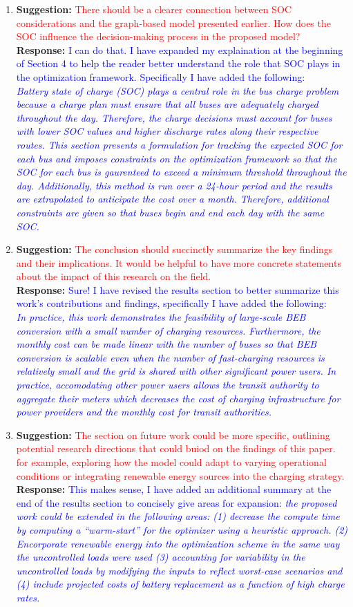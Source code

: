 \documentclass{article}
\newcommand\formatfeedback[2]
{%
	\textbf{Suggestion:} \textcolor{red}{#1} 
	\\[0.1in] \textbf{Response:} \textcolor{blue}{#2}
}
\begin{document}
\begin{enumerate}
	\item \formatfeedback{There should be a clearer connection between SOC considerations and the graph-based model presented earlier. How does the SOC influence the decision-making process in the proposed model?}
			     {I can do that.  I have expanded my explaination at the beginning of Section 4 to help the reader better understand the role that SOC plays in the optimization framework.  Specifically I have added the following: \\
{\it Battery state of charge (SOC) plays a central role in the bus charge problem because a charge plan must ensure that all buses are adequately charged throughout the day.  Therefore, the charge decisions must account for buses with lower SOC values and higher discharge rates along their respective routes. This section presents a formulation for tracking the expected SOC for each bus and imposes constraints on the optimization framework so that the SOC for each bus is gaurenteed to exceed a minimum threshold throughout the day. Additionally, this method is run over a 24-hour period and the results are extrapolated to anticipate the cost over a month. Therefore, additional constraints are given so that buses begin and end each day with the same SOC.}}
	\item \formatfeedback{The  conclusion should succinctly summarize the key findings and their implications. It would be helpful to have more concrete statements about the impact of this research on the field.}
			     {Sure!  I have revised the results section to better summarize this work's contributions and findings, specifically I have added the following:\\
{\it In practice, this work demonstrates the feasibility of large-scale BEB conversion with a small number of charging resources. Furthermore, the monthly cost can be made linear with the number of buses so that BEB conversion is scalable even when the number of fast-charging resources is relatively small and the grid is shared with other significant power users. In practice, accomodating other power users allows the transit authority to aggregate their meters which decreases the cost of charging infrastructure for power providers and the monthly cost for transit authorities.}}
        \item \formatfeedback{The section on future work could be more specific, outlining potential research directions that could buiod on the findings of this paper. for example, exploring how the model could adapt to varying operational conditions or integrating renewable energy sources into the charging strategy.}
			     {This makes sense, I have added an additional summary at the end of the results section to concisely give areas for expansion: {\it the proposed work could be extended in the following areas: (1) decrease the compute time by computing a ``warm-start'' for the optimizer using a heuristic approach. (2) Encorporate renewable energy into the optimization scheme in the same way the uncontrolled loads were used (3) accounting for variability in the uncontrolled loads by modifying the inputs to reflect worst-case scenarios and (4) include projected costs of battery replacement as a function of high charge rates.}}
\end{enumerate}
\end{document}
